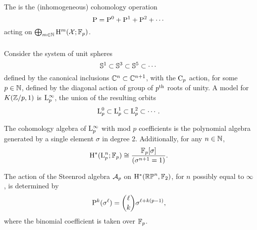 The  is the (inhomogeneous) cohomology operation
\[
\mathrm{P} = \mathrm{P}^0 + \mathrm{P}^1 + \mathrm{P}^2 + \dotsb
\]
acting on \(\bigoplus_{m \in \mathbb{N}} \mathrm{H}^m(\mathcal{X}; {\mathbb{F}_p})\).

\subsubsection{}\label{sss:cohomology_lens}

Consider the system of unit spheres
\[
\mathbb{S}^1 \subset \mathbb{S}^3 \subset \mathbb{S}^5 \subset \dotsb
\]
defined by the canonical inclusions \(\mathbb{C}^n \subset \mathbb{C}^{n+1}\), with the \(\mathrm{C}_p\) action, for some \(p \in \mathbb{N}\), defined by the diagonal action of group of \(p^{\mathrm{th}}\) roots of unity.
A model for \(K(\mathbb{Z}/p, 1)\) is \(\mathrm{L}^\infty_p\), the union of the resulting orbits
\[
\mathrm{L}^0_p \subset \mathrm{L}^1_p \subset \mathrm{L}^2_p \subset \dotsb.
\]

The cohomology algebra of $\mathrm{L}^\infty_p$ with mod \(p\) coefficients is the polynomial algebra generated by a single element $\sigma$ in degree 2.
Additionally, for any $n \in \mathbb{N}$,
\[
\mathrm{H}^\ast(\mathrm{L}^n_p; {\mathbb{F}_p}) \cong \frac{{\mathbb{F}_p}[\sigma]}{(\sigma^{n+1} = 1)}.
\]

The action of the Steenrod algebra $\mathcal{A}_p$ on $\mathrm{H}^*(\mathbb{RP}^n, {\mathbb{F}_2})$, for $n$ possibly equal to $\infty$, is determined by
\[
\mathrm{P}^k(\sigma^\ell) = \binom{\ell}{k}\sigma^{\ell+k(p-1)},
\]
where the binomial coefficient is taken over \({\mathbb{F}_p}\).

